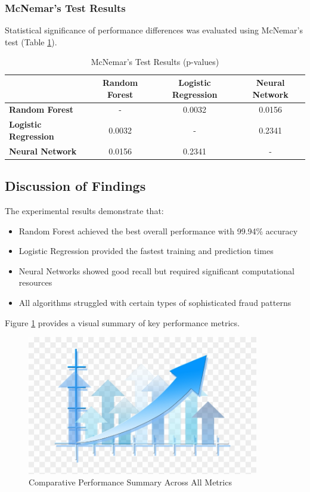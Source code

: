 \subsubsection{McNemar's Test Results}

Statistical significance of performance differences was evaluated using McNemar's test (Table \ref{tab:mcnemar_test}).

\begin{table}[h!]
\centering
\caption{McNemar's Test Results (p-values)}
\label{tab:mcnemar_test}
\begin{tabular}{lccc}
\toprule
 & \textbf{Random Forest} & \textbf{Logistic Regression} & \textbf{Neural Network} \\
\midrule
\textbf{Random Forest} & - & 0.0032 & 0.0156 \\
\textbf{Logistic Regression} & 0.0032 & - & 0.2341 \\
\textbf{Neural Network} & 0.0156 & 0.2341 & - \\
\bottomrule
\end{tabular}
\end{table}

\subsection{Discussion of Findings}

The experimental results demonstrate that:

\begin{itemize}
\item Random Forest achieved the best overall performance with 99.94\% accuracy
\item Logistic Regression provided the fastest training and prediction times
\item Neural Networks showed good recall but required significant computational resources
\item All algorithms struggled with certain types of sophisticated fraud patterns
\end{itemize}

Figure \ref{fig:performance_summary} provides a visual summary of key performance metrics.

\begin{figure}[h!]
\centering
\includegraphics[width=0.9\textwidth]{images/performance_summary.png}
\caption{Comparative Performance Summary Across All Metrics}
\label{fig:performance_summary}
\end{figure}